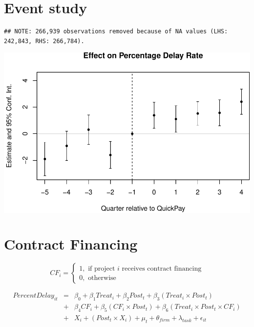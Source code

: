 \documentclass[
]{article}
\begin{document}
\hypertarget{event-study}{%
\section{Event study}\label{event-study}}

\begin{verbatim}
## NOTE: 266,939 observations removed because of NA values (LHS: 242,843, RHS: 266,784).
\end{verbatim}

\includegraphics{qp_first_pc_delay-2_files/figure-latex/event_study-1.pdf}

\hypertarget{contract-financing}{%
\section{Contract Financing}\label{contract-financing}}

\[ CF_i = \begin{cases} 1, \text{ if project } i \text{ receives contract financing}\\
0, \text{ otherwise} \end{cases}\]

\[ \begin{aligned}
PercentDelay_{it} &=& \beta_0+\beta_1 Treat_i + \beta_2 Post_t + \beta_3 (Treat_i \times Post_t) \\
&+&\beta_4 CF_i + \beta_5 (CF_i \times Post_t) + \beta_6 (Treat_i \times Post_t \times CF_i) \\ 
&+&X_i + (Post_t \times X_i) + \mu_t + \theta_{firm} + \lambda_{task}+ \epsilon_{it}
\end{aligned}\]
\end{document}
